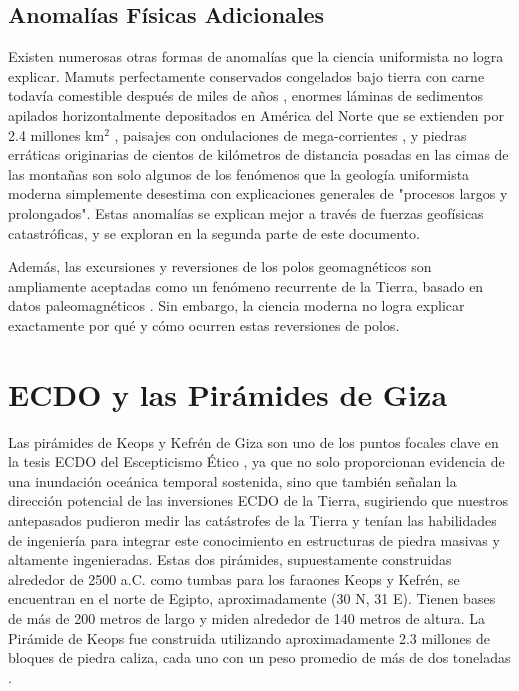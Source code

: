 \documentclass[10pt,twocolumn,letterpaper]{article}
\begin{document}
\subsection{Anomalías Físicas Adicionales}

Existen numerosas otras formas de anomalías que la ciencia uniformista no logra explicar. Mamuts perfectamente conservados congelados bajo tierra con carne todavía comestible después de miles de años \cite{17,18,19}, enormes láminas de sedimentos apilados horizontalmente depositados en América del Norte que se extienden por 2.4 millones km$^2$ \cite{21}, paisajes con ondulaciones de mega-corrientes \cite{22}, y piedras erráticas originarias de cientos de kilómetros de distancia posadas en las cimas de las montañas \cite{23,26} son solo algunos de los fenómenos que la geología uniformista moderna simplemente desestima con explicaciones generales de "procesos largos y prolongados". Estas anomalías se explican mejor a través de fuerzas geofísicas catastróficas, y se exploran en la segunda parte de este documento.

Además, las excursiones y reversiones de los polos geomagnéticos son ampliamente aceptadas como un fenómeno recurrente de la Tierra, basado en datos paleomagnéticos \cite{35,40,41}. Sin embargo, la ciencia moderna no logra explicar exactamente por qué y cómo ocurren estas reversiones de polos.

\section{ECDO y las Pirámides de Giza}

Las pirámides de Keops y Kefrén de Giza son uno de los puntos focales clave en la tesis ECDO del Escepticismo Ético \cite{27}, ya que no solo proporcionan evidencia de una inundación oceánica temporal sostenida, sino que también señalan la dirección potencial de las inversiones ECDO de la Tierra, sugiriendo que nuestros antepasados pudieron medir las catástrofes de la Tierra y tenían las habilidades de ingeniería para integrar este conocimiento en estructuras de piedra masivas y altamente ingenieradas. Estas dos pirámides, supuestamente construidas alrededor de 2500 a.C. como tumbas para los faraones Keops y Kefrén, se encuentran en el norte de Egipto, aproximadamente (30 N, 31 E). Tienen bases de más de 200 metros de largo y miden alrededor de 140 metros de altura. La Pirámide de Keops fue construida utilizando aproximadamente 2.3 millones de bloques de piedra caliza, cada uno con un peso promedio de más de dos toneladas \cite{24, 25}.
\end{document}
